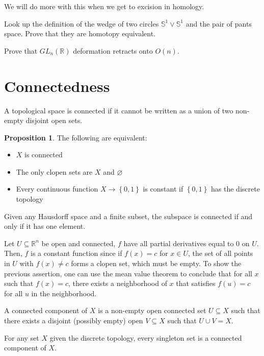 \documentclass[12pt,reqno]{amsart}
\numberwithin{theorem}{section}
\theoremstyle{definition}
\theoremstyle{remark}
\numberwithin{equation}{section}
\renewcommand{\S}{\mathbb S}
\newcommand{\set}[1]{\left \{ #1 \right \}}
\theoremstyle{definition}
\newtheorem{prop}[theorem]{Proposition}
\newcommand{\R}{\mathbb{R}}
\begin{document}
We will do more with this when we get to excision in homology.
\begin{exercise}
    Look up the definition of the wedge of two circles $\S^1\vee \S^1$ and the pair of pants space. Prove that they are homotopy equivalent.
\end{exercise}
\begin{exercise}
    Prove that $GL_n(\R)$ deformation retracts onto $O(n)$.
\end{exercise}
\section{Connectedness}
\begin{definition}
    A topological space is connected if it cannot be written as a union of two non-empty disjoint open sets.
\end{definition}
\begin{prop}
    The following are equivalent:
    \begin{itemize}
        \item $X$ is connected
        \item The only clopen sets are $X$ and $\varnothing$
        \item Every continuous function $X\rightarrow \set{0,1}$ is constant if $\set{0,1}$ has the discrete topology
    \end{itemize}
\end{prop}
\begin{example}
    Given any Hausdorff space and a finite subset, the subspace is connected if and only if it has one element.
\end{example}
\begin{example}
    Let $U\subseteq \R^n$ be open and connected, $f$ have all partial derivatives equal to 0 on $U$. Then, $f$ is a constant function since if $f(x) = c$ for $x\in U$, the set of all points in $U$ with $f(x) \neq c$ forms a clopen set, which must be empty. To show the previous assertion, one can use the mean value theorem to conclude that for all $x$ such that $f(x)=c$, there exists a neighborhood of $x$ that satisfies $f(u)=c$ for all $u$ in the neighborhood.
\end{example}
\begin{definition}
    A connected component of $X$ is a non-empty open connected set $U \subseteq X$ such that there exists a disjoint (possibly empty) open $V\subseteq X$ such that $U\cup V = X$.
\end{definition}
\begin{example}
    For any set $X$ given the discrete topology, every singleton set is a connected component of $X$.
\end{example}
\end{document}
